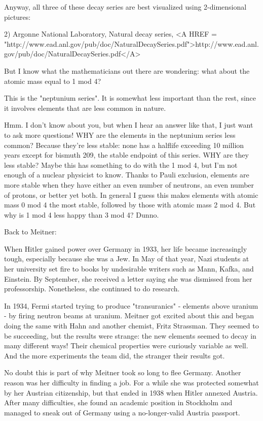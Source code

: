 Anyway, all three of these decay series are best visualized using
2-dimensional pictures:

2) Argonne National Laboratory, Natural decay series,
<A HREF = "http://www.ead.anl.gov/pub/doc/NaturalDecaySeries.pdf">http://www.ead.anl.gov/pub/doc/NaturalDecaySeries.pdf</A>

But I know what the mathematicians out there are wondering: what about
the atomic mass equal to 1 mod 4?

This is the "neptunium series".  It is somewhat less important
than the rest, since it involves elements that are less common in
nature.

Hmm.  I don't know about you, but when I hear an answer like that, I
just want to ask more questions!  WHY are the elements in the neptunium
series less common?  Because they're less stable: none has a halflife
exceeding 10 million years except for bismuth 209, the stable endpoint
of this series.  WHY are they less stable?  Maybe this has something to
do with the 1 mod 4, but I'm not enough of a nuclear physicist to know.
Thanks to Pauli exclusion, elements are more stable when they have
either an even number of neutrons, an even number of protons, or better
yet both.  In general I guess this makes elements with atomic mass 0
mod 4 the most stable, followed by those with atomic mass 2 mod 4.
But why is 1 mod 4 less happy than 3 mod 4?  Dunno.

Back to Meitner:

When Hitler gained power over Germany in 1933, her life became
increasingly tough, especially because she was a Jew.  In May of that
year, Nazi students at her university set fire to books by undesirable
writers such as Mann, Kafka, and Einstein.  By September, she received 
a letter saying she was dismissed from her professorship.  Nonetheless,
she continued to do research.  

In 1934, Fermi started trying to produce "transuranics" -
elements above uranium - by firing neutron beams at uranium.  Meitner
got excited about this and began doing the same with Hahn and another
chemist, Fritz Strassman.  They seemed to be succeeding, but the results
were strange: the new elements seemed to decay in many different ways!
Their chemical properties were curiously variable as well.  And the more
experiments the team did, the stranger their results got.

No doubt this is part of why Meitner took so long to flee Germany.
Another reason was her difficulty in finding a job.  For a while she was
protected somewhat by her Austrian citizenship, but that ended in 1938
when Hitler annexed Austria.  After many difficulties, she found an
academic position in Stockholm and managed to sneak out of Germany using
a no-longer-valid Austria passport.



